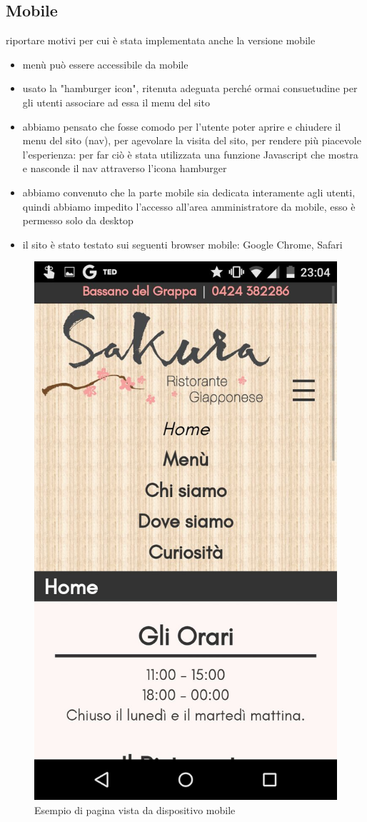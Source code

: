 \documentclass[../relazione.tex]{subfiles}
\begin{document}
	\subsection{Mobile}
	riportare motivi per cui è stata implementata anche la versione mobile
	\begin{itemize}
		\item menù può essere accessibile da mobile
		\item usato la "hamburger icon", ritenuta adeguata perché ormai consuetudine per gli utenti associare ad essa il menu del sito
		\item abbiamo pensato che fosse comodo per l'utente poter aprire e chiudere il menu del sito (nav), per agevolare la visita del sito, per rendere più piacevole l'esperienza: per far ciò è stata utilizzata una funzione Javascript che mostra e nasconde il nav attraverso l'icona hamburger
		\item abbiamo convenuto che la parte mobile sia dedicata interamente agli utenti, quindi abbiamo impedito l'accesso all'area amministratore da mobile, esso è permesso solo da desktop
		\item il sito è stato testato sui seguenti browser mobile: Google Chrome, Safari
	\end{itemize}
	\begin{figure}[H]
		\centering
		\includegraphics[scale=0.2]{images/mobile2}
		\caption{Esempio di pagina vista da dispositivo mobile}
		\label{fig:Esempio di pagina vista da dispositivo mobile}
	\end{figure}
\end{document}
